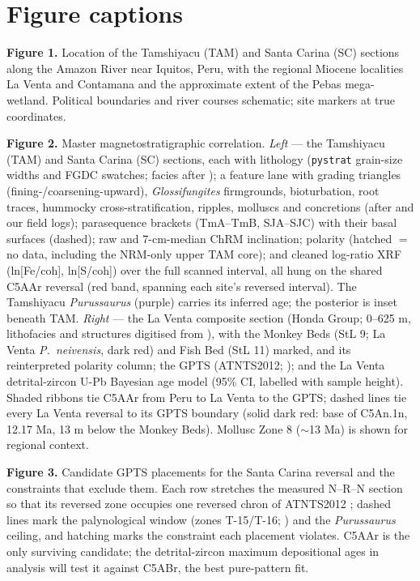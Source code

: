 \documentclass[12pt]{article}
\begin{document}
\clearpage
\section*{Figure captions}
\textbf{Figure 1.} Location of the Tamshiyacu (TAM) and Santa Carina (SC) sections along
the Amazon River near Iquitos, Peru, with the regional Miocene localities La Venta and
Contamana and the approximate extent of the Pebas mega-wetland. Political boundaries and
river courses schematic; site markers at true coordinates.

\textbf{Figure 2.} Master magnetostratigraphic correlation. \textit{Left} --- the Tamshiyacu
(TAM) and Santa Carina (SC) sections, each with lithology (\texttt{pystrat} grain-size widths and
FGDC swatches; facies after \citealp{Gingras2002}); a feature lane with grading triangles
(fining-/coarsening-upward), \textit{Glossifungites} firmgrounds, bioturbation, root traces,
hummocky cross-stratification, ripples, molluscs and concretions (after \citealp{Gingras2002} and
our field logs); parasequence brackets (TmA--TmB, SJA--SJC) with their basal surfaces (dashed);
raw and 7-cm-median ChRM inclination; polarity (hatched $=$ no data, including the NRM-only upper
TAM core); and cleaned log-ratio XRF (ln[Fe/coh], ln[S/coh]) over the full scanned interval, all
hung on the shared C5AAr reversal (red band, spanning each site's reversed interval). The
Tamshiyacu \textit{Purussaurus} (purple) carries its inferred age; the posterior is inset beneath
TAM. \textit{Right} --- the La Venta composite section (Honda Group; 0--625 m, lithofacies and
structures digitised from \citealp{MoraRojas2023}), with the Monkey Beds (StL 9; La Venta
\textit{P.~neivensis}, dark red) and Fish Bed (StL 11) marked, and its reinterpreted polarity
column; the GPTS (ATNTS2012; \citealp{Hilgen2012}); and the La Venta detrital-zircon U-Pb Bayesian
age model (95\% CI, labelled with sample height). Shaded ribbons tie C5AAr from Peru to La Venta to
the GPTS; dashed lines tie every La Venta reversal to its GPTS boundary (solid dark red: base of
C5An.1n, 12.17 Ma, 13 m below the Monkey Beds). Mollusc Zone 8 ($\sim$13 Ma) is shown for regional
context.

\textbf{Figure 3.} Candidate GPTS placements for the Santa Carina reversal and the
constraints that exclude them. Each row stretches the measured N--R--N section so that its
reversed zone occupies one reversed chron of ATNTS2012 \citep{Hilgen2012}; dashed lines
mark the palynological window (zones T-15/T-16; \citealp{Jaramillo2011}) and the
\textit{Purussaurus} ceiling, and hatching marks the constraint each placement violates.
C5AAr is the only surviving candidate; the detrital-zircon maximum depositional ages in
analysis will test it against C5ABr, the best pure-pattern fit.
\end{document}
